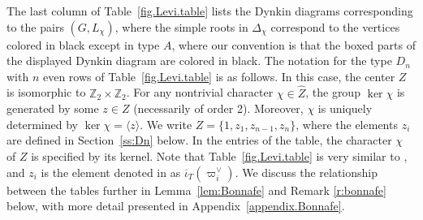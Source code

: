 \documentclass[reqno,11pt]{amsart}
\theoremstyle{remark}
\theoremstyle{remark}
\theoremstyle{definition}
\theoremstyle{definition}
\theoremstyle{definition}
\numberwithin{equation}{section}
\newcommand{\Z}{\mathbb{ Z}}           %
\renewcommand{\ker}{\operatorname{ker }}
\renewcommand{\hat}{\widehat}
\def\ibarT{\overline{\iota}_T}
\begin{document}
The last column of Table~\ref{fig.Levi.table} lists the Dynkin diagrams corresponding to the pairs $(G, L_{\chi})$, where the simple roots in $\Delta_{\chi}$ correspond to the vertices colored in black except in type $A$, where our convention is that the boxed parts of the displayed Dynkin diagram are colored in black.  
The notation for the type $D_n$ with $n$ even rows of Table~\ref{fig.Levi.table} is as follows.  In this case, the center $Z$ is isomorphic to $\Z_2 \times \Z_2$.  For any nontrivial character $\chi \in \hat{Z}$, the group $\ker \chi$ is generated by some $z \in Z$ (necessarily of order 2).  Moreover, $\chi$ is uniquely determined by $\ker \chi = \langle z \rangle$. We write $Z = \{ 1, z_1, z_{n-1}, z_n \}$, where the elements $z_i$ are defined in Section~\ref{ss:Dn} below.  In the entries of the table, the character $\chi$ of $Z$ is specified by its kernel. Note that Table~\ref{fig.Levi.table} is very similar to \cite[Table 2.17]{Bonnafe2004}, and $z_i$ is
the element denoted in \cite{Bonnafe2004} as $\ibarT(\varpi_i^{\vee})$.   We discuss the relationship between the tables further in Lemma~\ref{lem:Bonnafe} and Remark \ref{r:bonnafe} below, with more detail presented in Appendix~\ref{appendix.Bonnafe}. 
\end{document}
